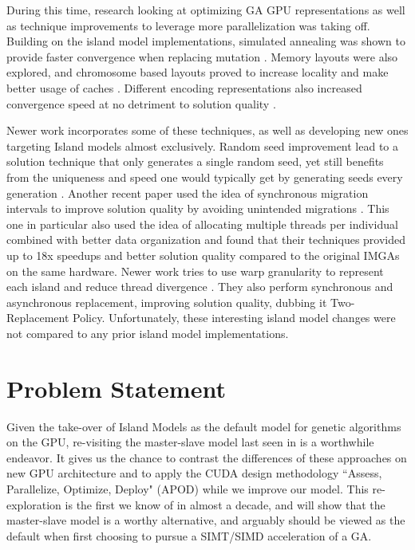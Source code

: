 \documentclass[11pt]{article}       %
\begin{document}
During this time, research looking at optimizing GA GPU representations as well as technique improvements to leverage more parallelization was taking off. Building on the island model implementations, simulated annealing was shown to provide faster convergence when replacing mutation \cite{li2017parallel}. Memory layouts were also explored, and chromosome based layouts proved to increase locality and make better usage of caches \cite{jahne2016overview}. Different encoding representations also increased convergence speed at no detriment to solution quality \cite{Pedemonte2011-zu}. 

Newer work incorporates some of these techniques, as well as developing new ones targeting Island models almost exclusively. Random seed improvement lead to a solution technique that only generates a single random seed, yet still benefits from the uniqueness and speed one would typically get by generating seeds every generation \cite{Sun2019-fj}. Another recent paper used the idea of synchronous migration intervals to improve solution quality by avoiding unintended migrations \cite{Janssen2022-kr}. This one in particular also used the idea of allocating multiple threads per individual \cite{shah2010gpu} combined with better data organization and found that their techniques provided up to 18x speedups and better solution quality compared to the original IMGAs on the same hardware.
Newer work tries to use warp granularity to represent each island and reduce thread divergence \cite{Amin2022-xd}. They also perform synchronous and asynchronous replacement, improving solution quality, dubbing it Two-Replacement Policy. Unfortunately, these interesting island model changes were not compared to any prior island model implementations.

\section{Problem Statement} \label{probstat}
Given the take-over of Island Models as the default model for genetic algorithms on the GPU, re-visiting the master-slave model last seen in \cite{Cavuoti2013-oy} is a worthwhile endeavor. It gives us the chance to contrast the differences of these approaches on new GPU architecture and to apply the CUDA design methodology ``Assess, Parallelize, Optimize, Deploy" (APOD) \cite{bradley_2012} while we improve our model. This re-exploration is the first we know of in almost a decade, and will show that the master-slave model is a worthy alternative, and arguably should be viewed as the default when first choosing to pursue a SIMT/SIMD  acceleration of a GA. 
\end{document}
